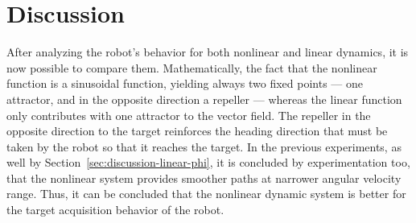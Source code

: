 \section{Discussion}
After analyzing the robot's behavior for both nonlinear and linear dynamics, it
is now possible to compare them.
Mathematically, the fact that the nonlinear function is a sinusoidal function, yielding always
two fixed points --- one attractor, and in the opposite direction a
repeller --- whereas the linear function only contributes with one attractor to
the vector field. 
The repeller in the opposite direction to the target reinforces the heading direction that must be taken by the robot so that it reaches the target.
In the previous experiments, as well by Section~\ref{sec:discussion-linear-phi},
it is concluded by experimentation too, that the nonlinear system provides smoother paths at narrower angular velocity range.
Thus, it can be concluded that the nonlinear dynamic system is better for the target acquisition behavior of the robot. 

